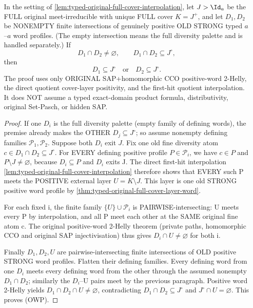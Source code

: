 \begin{lemma}
\label{lem:typed-original-strong-exact-prime}
In the setting of
\cref{lem:typed-original-full-cover-interpolation},
let $J>\Id_a$ be the FULL original
meet-irreducible with unique FULL
cover $K=J^+$, and let $D_1,D_2$
be NONEMPTY finite intersections
of genuinely positive OLD STRONG
typed $a$--$a$ word profiles.
(The empty intersection means
the full diversity palette and
is handled separately.) If
\[
     D_1\cap D_2\ne\varnothing,\qquad
     D_1\cap D_2\subseteq J^\circ,
\]
then
\[
                 D_1\subseteq J^\circ
                   \quad\text{or}\quad
                 D_2\subseteq J^\circ.
\tag{OWP}\label{eq:typed-original-strong-exact-prime}
\]
The proof uses only ORIGINAL
SAP+homomorphic CCO positive-word
2-Helly, the direct quotient
cover-layer positivity, and
the first-hit quotient
interpolation. It does NOT
assume a typed exact-domain
product formula, distributivity,
original Set-Pasch, or hidden SAP.
\end{lemma}
\begin{proof}
If one $D_i$ is the full
diversity palette (empty family
of defining words), the premise
already makes the OTHER
$D_j\subseteq J^\circ$;
so assume nonempty defining
families $\mathcal P_1,\mathcal P_2$.
Suppose both $D_i$ exit $J$.
Fix one old fine diversity atom
$c\in D_1\cap D_2\subseteq J^\circ$.
For EVERY defining positive
profile $P\in\mathcal P_i$,
we have $c\in P$ and
$P\setminus J\ne\varnothing$,
because $D_i\subseteq P$
and $D_i$ exits J.
The direct first-hit interpolation
\cref{lem:typed-original-full-cover-interpolation}
therefore shows that EVERY such
P meets the POSITIVE external
layer $U=K\setminus J$.
This layer is one old STRONG
positive word profile by
\cref{thm:typed-original-full-cover-layer-word}.

For each fixed i, the finite
family $\{U\}\cup\mathcal P_i$
is PAIRWISE-intersecting: U
meets every P by interpolation,
and all P meet each other at
the SAME original fine atom c.
The original positive-word
2-Helly theorem (private paths,
homomorphic CCO and original SAP
injectivisation) thus gives
$D_i\cap U\ne\varnothing$ for
both i.

Finally $D_1,D_2,U$ are
pairwise-intersecting finite
intersections of OLD positive
STRONG word profiles. Flatten
their defining families.
Every defining word from one
$D_i$ meets every defining
word from the other through
the assumed nonempty
$D_1\cap D_2$; similarly the
$D_i$--U pairs meet by the
previous paragraph. Positive
word 2-Helly yields
$D_1\cap D_2\cap U
\ne\varnothing$, contradicting
$D_1\cap D_2\subseteq J^\circ$
and $J^\circ\cap U=\varnothing$.
This proves (OWP).
\end{proof}

